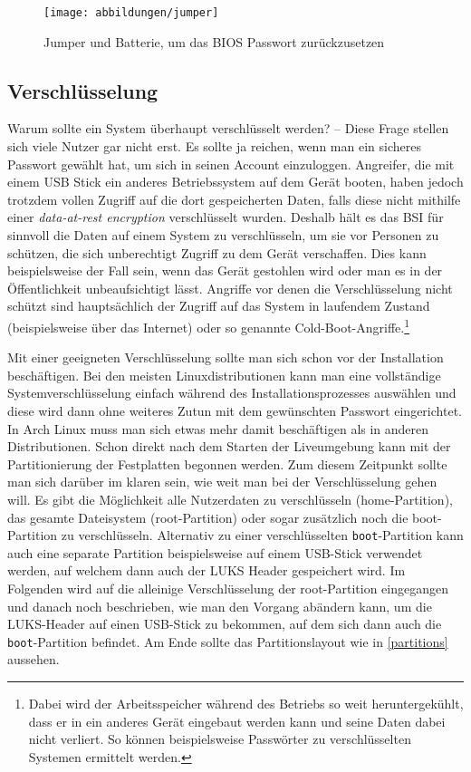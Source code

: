 \begin{figure}[!h]
	\centering
	\texttt{[image: abbildungen/jumper]}
	\caption{Jumper und Batterie, um das \ac{BIOS} Passwort zurückzusetzen\cite{HowResetPC2015}}
	\label{fig:jumper}
\end{figure}

\subsection{Verschlüsselung}\label{sec:enc}
Warum sollte ein System überhaupt verschlüsselt werden? -- Diese Frage stellen sich viele Nutzer gar nicht erst. Es sollte ja reichen, wenn man ein sicheres Passwort gewählt hat, um sich in seinen Account einzuloggen. Angreifer, die mit einem USB Stick ein anderes Betriebssystem auf dem Gerät booten, haben jedoch trotzdem vollen Zugriff auf die dort gespeicherten Daten, falls diese nicht mithilfe einer \emph{data-at-rest encryption} verschlüsselt wurden.\cite{FullDiskEncryptionFDE} Deshalb hält es das \ac{BSI} für sinnvoll die Daten auf einem System zu verschlüsseln, um sie vor Personen zu schützen, die sich unberechtigt Zugriff zu dem Gerät verschaffen.\cite{Datenverschlusselung} Dies kann beispielsweise der Fall sein, wenn das Gerät gestohlen wird oder man es in der Öffentlichkeit unbeaufsichtigt lässt.\cite{DataatrestEncryptionArchWiki} Angriffe vor denen die Verschlüsselung nicht schützt sind hauptsächlich der Zugriff auf das System in laufendem Zustand {\small(beispielsweise über das Internet)} oder so genannte Cold-Boot-Angriffe.\footnote{Dabei wird der Arbeitsspeicher während des Betriebs so weit heruntergekühlt, dass er in ein anderes Gerät eingebaut werden kann und seine Daten dabei nicht verliert. So können beispielsweise Passwörter zu verschlüsselten Systemen ermittelt werden.}\cite[S. 45 f.]{ColdBootAttacks2008}

Mit einer geeigneten Verschlüsselung sollte man sich schon vor der Installation beschäftigen. Bei den meisten Linuxdistributionen kann man eine vollständige Systemverschlüsselung einfach während des Installationsprozesses auswählen und diese wird dann ohne weiteres Zutun mit dem gewünschten Passwort eingerichtet. In Arch Linux  muss man sich etwas mehr damit beschäftigen als in anderen Distributionen. Schon direkt nach dem Starten der Liveumgebung kann mit der Partitionierung der Festplatten begonnen werden.\cite{DmcryptEncryptingEntire} Zum diesem Zeitpunkt sollte man sich darüber im klaren sein, wie weit man bei der Verschlüsselung gehen will. Es gibt die Möglichkeit alle Nutzerdaten zu verschlüsseln {\small(home-Partition)}, das gesamte Dateisystem {\small(root-Partition)} oder sogar zusätzlich noch die boot-Partition zu verschlüsseln. Alternativ zu einer verschlüsselten \texttt{boot}-Partition kann auch eine separate Partition beispielsweise auf einem USB-Stick verwendet werden, auf welchem dann auch der \ac{LUKS} Header gespeichert wird. Im Folgenden wird auf die alleinige Verschlüsselung der root-Partition eingegangen und danach noch beschrieben, wie man den Vorgang abändern kann, um die \ac{LUKS}-Header auf einen USB-Stick zu bekommen, auf dem sich dann auch die \texttt{boot}-Partition befindet. Am Ende sollte das Partitionslayout wie in \autoref{partitions} aussehen.

